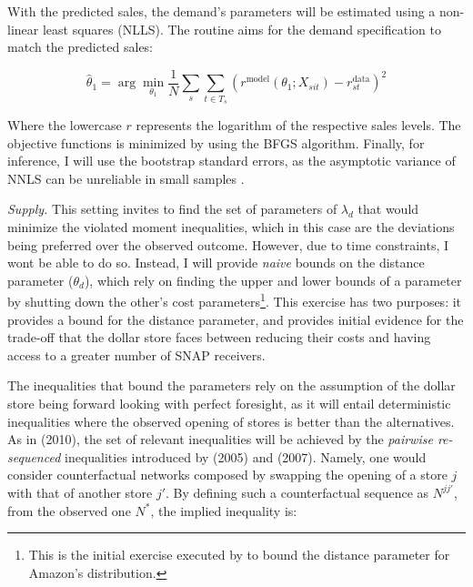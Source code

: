 \documentclass[11.5pt]{article}
\begin{document}
With the predicted sales, the demand's parameters will be estimated using a non-linear least squares (NLLS). The routine aims for the demand specification to match the predicted sales:

\[\hat \theta_\text{1} = \arg \min_{\theta_1} \frac{1}{N} \sum_{s} \sum_{t \in T_s} \left( r^\text{model}(\theta_1;X_{sit})  - r^\text{data}_{st}\right)^2 \]

 Where the lowercase $r$ represents the logarithm of the respective sales levels. The objective functions is minimized by using the BFGS algorithm. Finally, for inference, I will use the bootstrap standard errors, as the asymptotic variance of NNLS can be unreliable in small samples \cite{hansen2022econometrics}.



\textit{Supply.} This setting invites to find the set of parameters of $\lambda_d$ that would minimize the violated moment inequalities, which in this case are the deviations being preferred over the observed outcome. However, due to time constraints, I wont be able to do so. Instead, I will provide \textit{naive} bounds on the distance parameter ($\theta_d$), which rely on finding the upper and lower bounds of a parameter by shutting down the other's cost parameters\footnote{This is the initial exercise executed by \citeauthor{houde2023nexus} \citeyear{houde2023nexus} to bound the distance parameter for Amazon's distribution.}. This exercise has two purposes: it provides a bound for the distance parameter, and provides initial evidence for the trade-off that the dollar store faces between reducing their costs and having access to a greater number of SNAP receivers. 


The inequalities that bound the parameters rely on the assumption of the dollar store being forward looking with perfect foresight, as it will entail deterministic inequalities where the observed opening of stores is better than the alternatives.  As in \citeauthor{holmes2011diffusion} (2010), the set of relevant inequalities will be achieved by the \textit{pairwise re-sequenced} inequalities introduced by  \citeauthor{bajari2005measuring} (2005) and \citeauthor{fox2007semiparametric} (2007). Namely, one would consider counterfactual networks composed by swapping the opening of a store $j$ with that of another store $j'$. By defining such a counterfactual sequence as $N^{jj'}$, from the observed one $N^*$, the implied inequality is:
\end{document}
